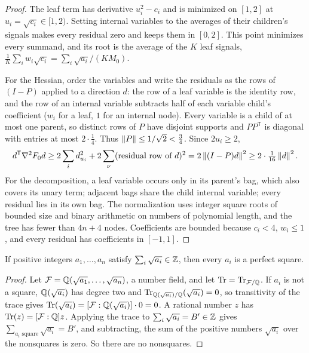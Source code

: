 \begin{proof}
The leaf term has derivative $u_i^2-c_i$ and is minimized on $[1,2]$ at
$u_i=\sqrt{c_i}\in[1,2)$. Setting internal variables to the averages of
their children's signals makes every residual zero and keeps them in
$[0,2]$. This point minimizes every summand, and its root is the average of
the $K$ leaf signals,
$\frac1K\sum_iw_i\sqrt{c_i}=\sum_i\sqrt{a_i}/(KM_0)$.

For the Hessian, order the variables and write the residuals as the rows of
$(I-P)$ applied to a direction $d$: the row of a leaf variable is the
identity row, and the row of an internal variable subtracts half of each
variable child's coefficient ($w_i$ for a leaf, $1$ for an internal node).
Every variable is a child of at most one parent, so distinct rows of $P$
have disjoint supports and $PP^{\mathsf T}$ is diagonal with entries at most
$2\cdot\frac14$. Thus $\left\lVert P\right\rVert\le1/\sqrt2<\frac34$. Since $2u_i\ge2$,
\[
 d^{\mathsf T}\nabla^2F_0d\ge2\sum_id_{u_i}^2+2\sum_\nu(\text{residual
 row of }d)^2=2\left\lVert(I-P)d\right\rVert^2\ge2\cdot\tfrac1{16}\left\lVert d\right\rVert^2 .
\]
For the decomposition, a leaf variable occurs only in its parent's bag,
which also covers its unary term; adjacent bags share the child internal
variable; every residual lies in its own bag. The normalization uses
integer square roots of bounded size and binary arithmetic on numbers of
polynomial length, and the tree has fewer than $4n+4$ nodes. Coefficients
are bounded because $c_i<4$, $w_i\le1$, and every residual has coefficients
in $[-1,1]$.
\end{proof}

\begin{lemma}\label{lem:points-trace}
If positive integers $a_1,\ldots,a_n$ satisfy $\sum_i\sqrt{a_i}\in\mathbb Z$, then
every $a_i$ is a perfect square.
\end{lemma}

\begin{proof}
Let $\mathcal F=\mathbb Q(\sqrt{a_1},\ldots,\sqrt{a_n})$, a number field, and let
$\operatorname{Tr}=\operatorname{Tr}_{\mathcal F/\mathbb Q}$. If $a_i$ is not a
square, $\mathbb Q(\sqrt{a_i})$ has degree two and
$\operatorname{Tr}_{\mathbb Q(\sqrt{a_i})/\mathbb Q}(\sqrt{a_i})=0$, so transitivity of the
trace gives $\operatorname{Tr}(\sqrt{a_i})=[\mathcal
F:\mathbb Q(\sqrt{a_i})]\cdot0=0$. A rational number $z$ has
$\operatorname{Tr}(z)=[\mathcal F:\mathbb Q]z$. Applying the trace to
$\sum_i\sqrt{a_i}=B'\in\mathbb Z$ gives $\sum_{a_i\text{ square}}\sqrt{a_i}=B'$, and
subtracting, the sum of the positive numbers $\sqrt{a_i}$ over the
nonsquares is zero. So there are no nonsquares.
\end{proof}

